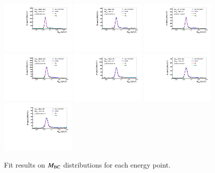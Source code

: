 \begin{figure}
    \includegraphics[width=0.32\textwidth]{figure/fit_mbc/STdata4700_1001.pdf}
    \includegraphics[width=0.32\textwidth]{figure/fit_mbc/STdata4740_1001.pdf}
    \includegraphics[width=0.32\textwidth]{figure/fit_mbc/STdata4750_1001.pdf}\\
    \includegraphics[width=0.32\textwidth]{figure/fit_mbc/STdata4780_1001.pdf}
    \includegraphics[width=0.32\textwidth]{figure/fit_mbc/STdata4840_1001.pdf}
    \includegraphics[width=0.32\textwidth]{figure/fit_mbc/STdata4914_1001.pdf}\\
    \includegraphics[width=0.32\textwidth]{figure/fit_mbc/STdata4946_1001.pdf}
    \caption{Fit results on $M_{\rm{BC}}$ distributions for each energy point.}
\label{fig:fit_mbc}
\end{figure}

